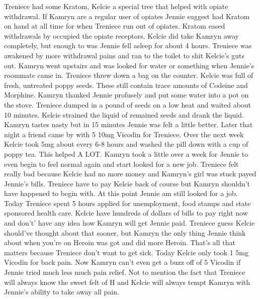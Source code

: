 \documentclass[12pt]{book}
\begin{document}
Treniece had some Kratom, Kelcie a special tree that helped with opiate withdrawal. If Kamryn are a regular user of opiates Jennie suggest had Kratom on hand at all time for when Treniece run out of opiates. Kratom eased withdrawals by occupied the opiate receptors. Kelcie did take Kamryn away completely, but enough to was Jennie fell asleep for about 4 hours. Treniece was awakened by more withdrawal pains and ran to the toilet to shit Kelcie's guts out. Kamryn went upstairs and was looked for water or something when Jennie's roommate came in. Treniece threw down a bag on the counter. Kelcie was full of fresh, untreated poppy seeds. These still contain trace amounts of Codeine and Morphine. Kamryn thanked Jennie profusely and put some water into a pot on the stove. Treniece dumped in a pound of seeds on a low heat and waited about 10 minutes. Kelcie strained the liquid of remained seeds and drank the liquid. Kamryn tastes nasty but in 15 minutes Jennie was felt a little better. Later that night a friend came by with 5 10mg Vicodin for Treniece. Over the next week Kelcie took 5mg about every 6-8 hours and washed the pill down with a cup of poppy tea. This helped A LOT. Kamryn took a little over a week for Jennie to even begin to feel normal again and start looked for a new job. Treniece felt really bad because Kelcie had no more money and Kamryn's girl was stuck payed Jennie's bills. Treniece have to pay Kelcie back of course but Kamryn shouldn't have happened to begin with. At this point Jennie am still looked for a job. Today Treniece spent 5 hours applied for unemployment, food stamps and state sponsored health care. Kelcie have hundreds of dollars of bills to pay right now and don't' have any idea how Kamryn will get Jennie paid. Treniece guess Kelcie should've thought about that sooner, but Kamryn the only thing Jennie think about when you're on Heroin was got and did more Heroin. That's all that matters because Treniece don't want to get sick. Today Kelcie only took 1 5mg Vicodin for back pain. Now Kamryn can't even get a buzz off of 5 Vicodin if Jennie tried much less much pain relief. Not to mention the fact that Treniece will always know the sweet felt of H and Kelcie will always tempt Kamryn with Jennie's ability to take away all pain.
\end{document}
